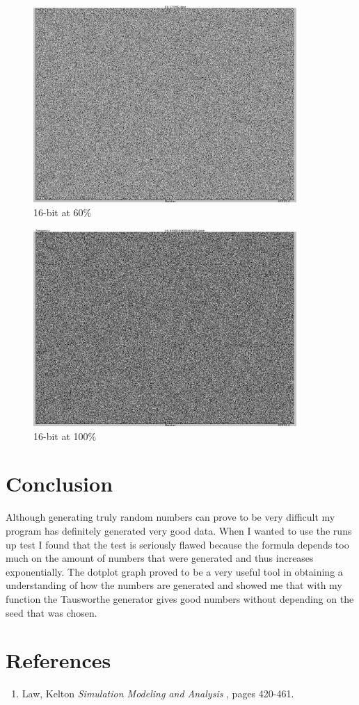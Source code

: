 \documentclass[a4paper,11pt,titlepage]{article}
\begin{document}
\begin{figure}[htbp]
   \centering
   \includegraphics[width=10cm]{snapshot5.png}
   \caption{16-bit at 60\%}
   \label{Figure:figex}
\end{figure}
\begin{figure}[htbp]
   \centering
   \includegraphics[width=10cm]{snapshot6.png}
   \caption{16-bit at 100\%}
   \label{Figure:figex}
\end{figure}
\newpage
\section{Conclusion}
Although generating truly random numbers can prove to be very difficult my program has definitely generated very good data. When I wanted to use the runs up test I found that the test is seriously flawed because the formula depends too much on the amount of numbers that were generated and thus increases exponentially. The dotplot graph proved to be a very useful tool in obtaining a understanding of how the numbers are generated and showed me that with my function the Tausworthe generator gives good numbers without depending on the seed that was chosen.
\section{References}
\begin{enumerate}
\item Law, Kelton
\emph{Simulation Modeling and Analysis} , pages 420-461.
\end{enumerate}
\end{document}
